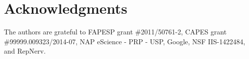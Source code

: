 \section{Acknowledgments}
The authors are grateful to FAPESP grant \#2011/50761-2, CAPES grant \#99999.009323/2014-07, NAP eScience - PRP - USP, Google, NSF IIS-1422484, and RepNerv.